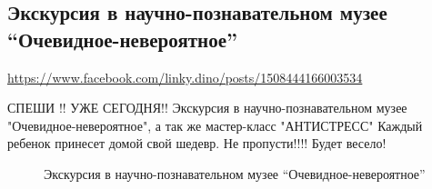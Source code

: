  
 

\subsection{Экскурсия в научно-познавательном музее ``Очевидное-невероятное''}
\label{sec:25_07_2020.fb.lnr.1}
\url{https://www.facebook.com/linky.dino/posts/1508444166003534}


СПЕШИ !! УЖЕ СЕГОДНЯ!! Экскурсия в научно-познавательном музее
"Очевидное-невероятное", а так же мастер-класс "АНТИСТРЕСС" Каждый ребенок
принесет домой свой шедевр. Не пропусти!!!! Будет весело!
  
\begin{figure}[ht]
 \centering
 \caption{Экскурсия в научно-познавательном музее ``Очевидное-невероятное''}
 \label{fig:}
\end{figure}
